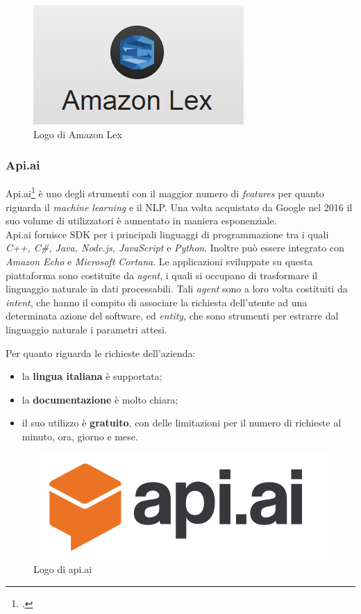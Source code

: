 \begin{figure}[h]
	\centering
	\includegraphics[scale=0.6]{../Immagini/amazon-lex.png}
	\caption{Logo di Amazon Lex}
\end{figure}
\newpage
\subsubsection{Api.ai}
Api.ai\footcite{apiai} è uno degli strumenti con il maggior numero di \emph{features} per quanto riguarda il \emph{machine learning} e il \gls{NLP}. Una volta acquistato da Google nel 2016 il suo volume di utilizzatori è aumentato in maniera esponenziale. \\
Api.ai fornisce \gls{SDK} per i principali linguaggi di programmazione tra i quali \emph{C++, C\#, Java, Node.js, JavaScript} e \emph{Python}. Inoltre può essere integrato con \emph{Amazon Echo} e \emph{Microsoft Cortana}. Le applicazioni sviluppate su questa piattaforma sono costituite da \emph{agent}, i quali si occupano di trasformare il linguaggio naturale in dati processabili. Tali \emph{agent} sono a loro volta costituiti da \emph{intent}, che hanno il compito di associare la richiesta dell'utente ad una determinata azione del software, ed \emph{entity}, che sono strumenti per estrarre dal linguaggio naturale i parametri attesi.

Per quanto riguarda le richieste dell'azienda:
\begin{itemize}
	\item la \textbf{lingua italiana} è supportata;
	\item la \textbf{documentazione} è molto chiara;
	\item il suo utilizzo è \textbf{gratuito}, con delle limitazioni per il numero di richieste al minuto, ora, giorno e mese.
\end{itemize}

\begin{figure}[h]
	\centering
	\includegraphics[scale=0.25]{../Immagini/apiai.png}
	\caption{Logo di api.ai}
\end{figure}

